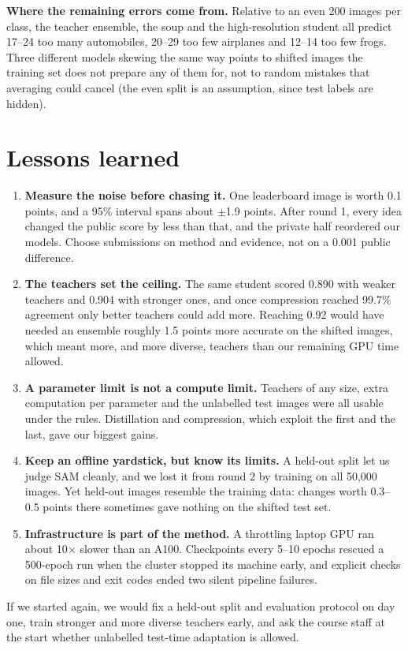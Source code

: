 \documentclass[11pt]{article}
\begin{document}
\textbf{Where the remaining errors come from.} Relative to an even 200 images per class, the teacher ensemble, the soup and the high-resolution student all predict 17--24 too many automobiles, 20--29 too few airplanes and 12--14 too few frogs. Three different models skewing the same way points to shifted images the training set does not prepare any of them for, not to random mistakes that averaging could cancel (the even split is an assumption, since test labels are hidden).

\section{Lessons learned}
\begin{enumerate}
\item \textbf{Measure the noise before chasing it.} One leaderboard image is worth 0.1 points, and a 95\% interval spans about $\pm$1.9 points. After round 1, every idea changed the public score by less than that, and the private half reordered our models. Choose submissions on method and evidence, not on a 0.001 public difference.
\item \textbf{The teachers set the ceiling.} The same student scored 0.890 with weaker teachers and 0.904 with stronger ones, and once compression reached 99.7\% agreement only better teachers could add more. Reaching 0.92 would have needed an ensemble roughly 1.5 points more accurate on the shifted images, which meant more, and more diverse, teachers than our remaining GPU time allowed.
\item \textbf{A parameter limit is not a compute limit.} Teachers of any size, extra computation per parameter and the unlabelled test images were all usable under the rules. Distillation and compression, which exploit the first and the last, gave our biggest gains.
\item \textbf{Keep an offline yardstick, but know its limits.} A held-out split let us judge SAM cleanly, and we lost it from round 2 by training on all 50,000 images. Yet held-out images resemble the training data: changes worth 0.3--0.5 points there sometimes gave nothing on the shifted test set.
\item \textbf{Infrastructure is part of the method.} A throttling laptop GPU ran about 10$\times$ slower than an A100. Checkpoints every 5--10 epochs rescued a 500-epoch run when the cluster stopped its machine early, and explicit checks on file sizes and exit codes ended two silent pipeline failures.
\end{enumerate}
If we started again, we would fix a held-out split and evaluation protocol on day one, train stronger and more diverse teachers early, and ask the course staff at the start whether unlabelled test-time adaptation is allowed.
\end{document}
